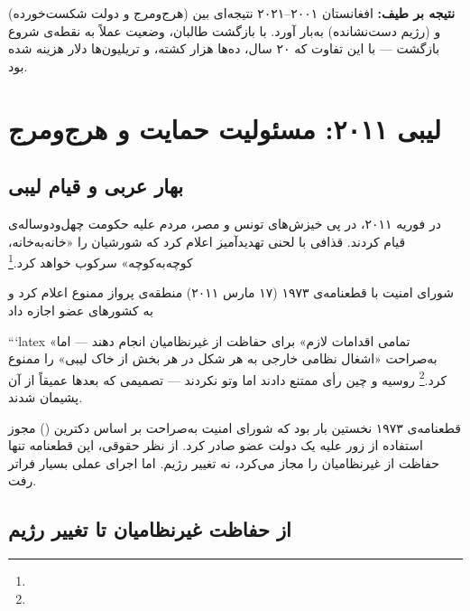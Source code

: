 \textbf{نتیجه بر طیف:} افغانستان ۲۰۰۱–۲۰۲۱ نتیجه‌ای بین  (هرج‌ومرج و دولت شکست‌خورده) و  (رژیم دست‌نشانده) به‌بار آورد. با بازگشت طالبان، وضعیت عملاً به نقطه‌ی شروع بازگشت — با این تفاوت که ۲۰ سال، ده‌ها هزار کشته، و تریلیون‌ها دلار هزینه شده بود.


\section{لیبی ۲۰۱۱: مسئولیت حمایت و هرج‌ومرج}
\label{sec:ch10-libya}

\subsection{بهار عربی و قیام لیبی}
\label{subsec:ch10-libya-uprising}

در فوریه ۲۰۱۱، در پی خیزش‌های تونس و مصر، مردم  علیه حکومت چهل‌ودوساله‌ی  قیام کردند. قذافی با لحنی تهدیدآمیز اعلام کرد که شورشیان را «خانه‌به‌خانه، کوچه‌به‌کوچه» سرکوب خواهد کرد.\footnote{}

شورای امنیت با قطعنامه‌ی ۱۹۷۳ (۱۷ مارس ۲۰۱۱) منطقه‌ی پرواز ممنوع اعلام کرد و به کشورهای عضو اجازه داد

```latex
«تمامی اقدامات لازم» برای حفاظت از غیرنظامیان انجام دهند — اما به‌صراحت «اشغال نظامی خارجی به هر شکل در هر بخش از خاک لیبی» را ممنوع کرد.\footnote{} روسیه و چین رأی ممتنع دادند اما وتو نکردند — تصمیمی که بعدها عمیقاً از آن پشیمان شدند.

\begin{tcolorbox}[legalbox, title={نکته‌ی حقوقی: قطعنامه‌ی ۱۹۷۳ و مسئولیت حمایت}]
قطعنامه‌ی ۱۹۷۳ نخستین بار بود که شورای امنیت به‌صراحت بر اساس دکترین  () مجوز استفاده از زور علیه یک دولت عضو صادر کرد. از نظر حقوقی، این قطعنامه تنها حفاظت از غیرنظامیان را مجاز می‌کرد، نه تغییر رژیم. اما اجرای عملی بسیار فراتر رفت.
\end{tcolorbox}

\subsection{از حفاظت غیرنظامیان تا تغییر رژیم}
\label{subsec:ch10-libya-regimechange}

